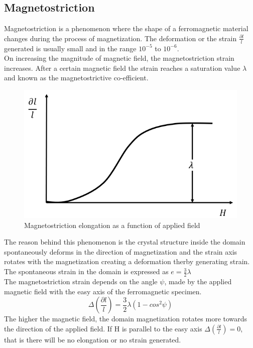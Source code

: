 \subsection{Magnetostriction}
Magnetostriction is a phenomenon where the shape of a ferromagnetic material changes during the process of magnetization. The deformation or the strain $ \frac{\partial l}{l}$ generated is usually small and in the range $10^{-5}$ to $10^{-6}$.\\
On increasing the magnitude of magnetic field, the magnetostriction strain increases. After a certain magnetic field the strain reaches a saturation value $\lambda$ and known as the magnetostrictive co-efficient.
\begin{figure}[H]
	\centering
   \includegraphics[scale=0.56]{Images/24.png} 
   \caption{Magnetostriction elongation as a function of applied field}
\end{figure}
The reason behind this phenomenon is the crystal structure inside the domain spontaneously deforms in the direction of magnetization and the strain axis rotates with the magnetization creating a deformation therby generating strain.\\
The spontaneous strain in the domain is expressed as $e=\frac{3}{2} \lambda$\\
The magnetostriction strain depends on the angle $\psi$, made by the applied magnetic field with the easy axis of the ferromagnetic specimen.
\[\Delta(\frac{\partial l}{l})=\frac{3}{2}\lambda(1-cos^2\psi)\]
The higher the magnetic field, the domain magnetization rotates more towards the direction of the applied field. If H is parallel to the easy axis $\Delta(\frac{\partial l}{l})=0$, that is there will be no elongation or no strain generated.

